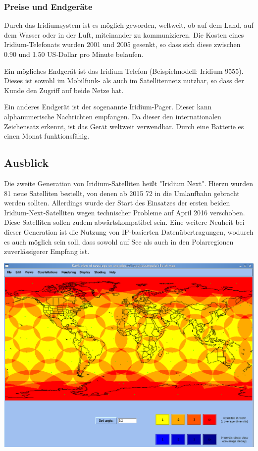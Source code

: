 \begin{multicols}{3}

\subsubsection*{Preise und Endgeräte}
Durch das Iridiumsystem ist es möglich geworden, weltweit, ob auf dem Land, auf dem Wasser oder in der Luft, miteinander zu kommunizieren. Die Kosten eines Iridium-Telefonats wurden 2001 und 2005 gesenkt, so dass sich diese zwischen 0.90 und 1.50 US-Dollar pro Minute belaufen.

Ein mögliches Endgerät ist das Iridium Telefon (Beispielmodell: Iridium 9555). Dieses ist sowohl im Mobilfunk- als auch im Satellitennetz nutzbar, so dass der Kunde den Zugriff auf beide Netze hat.

Ein anderes Endgerät ist der sogenannte Iridium-Pager. Dieser kann alphanumerische Nachrichten empfangen. Da dieser den internationalen Zeichensatz erkennt, ist das Gerät weltweit verwendbar. Durch eine Batterie es einen Monat funktionsfähig.~\cite{I1, I4}

\subsection*{Ausblick}
Die zweite Generation von Iridium-Satelliten heißt "Iridium Next". Hierzu wurden 81 neue Satelliten bestellt, von denen ab 2015 72 in die Umlaufbahn gebracht werden sollten.  Allerdings wurde der Start des Einsatzes der ersten beiden Iridium-Next-Satelliten wegen technischer Probleme auf April 2016 verschoben. Diese Satelliten sollen zudem abwärtskompatibel sein. Eine weitere Neuheit bei dieser Generation ist die Nutzung von IP-basierten Datenübertragungen, wodurch es auch möglich sein soll, dass sowohl auf See als auch in den Polarregionen zuverlässigerer Empfang ist.~\cite{I2, I7}


\printbibliography[segment=4,heading=subbibliography]
\end{multicols}
\begin{Figure}
	\includegraphics[width=\linewidth, height= 7.6 cm]{Kapitel/Iridium/Grafiken/netzabdeckung82.png}
	\label{na8.2}
\end{Figure}

\newpage

